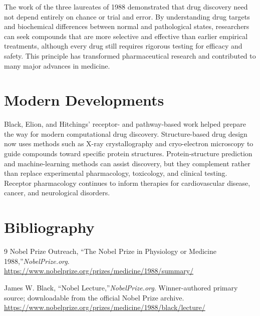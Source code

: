 The work of the three laureates of 1988 demonstrated that drug discovery need not depend entirely on chance or trial and error. By understanding drug targets and biochemical differences between normal and pathological states, researchers can seek compounds that are more selective and effective than earlier empirical treatments, although every drug still requires rigorous testing for efficacy and safety. This principle has transformed pharmaceutical research and contributed to many major advances in medicine.


\section{Modern Developments}

Black, Elion, and Hitchings' receptor- and pathway-based work helped prepare the way for modern computational drug discovery. Structure-based drug design now uses methods such as X-ray crystallography and cryo-electron microscopy to guide compounds toward specific protein structures. Protein-structure prediction and machine-learning methods can assist discovery, but they complement rather than replace experimental pharmacology, toxicology, and clinical testing. Receptor pharmacology continues to inform therapies for cardiovascular disease, cancer, and neurological disorders.


\section{Bibliography}

\begin{thebibliography}{9}
Nobel Prize Outreach, ``The Nobel Prize in Physiology or Medicine 1988,''\emph{NobelPrize.org}.\\
\url{https://www.nobelprize.org/prizes/medicine/1988/summary/}

James W. Black, ``Nobel Lecture,''\emph{NobelPrize.org}. Winner-authored primary source; downloadable from the official Nobel Prize archive.\\
\url{https://www.nobelprize.org/prizes/medicine/1988/black/lecture/}
\end{thebibliography}
